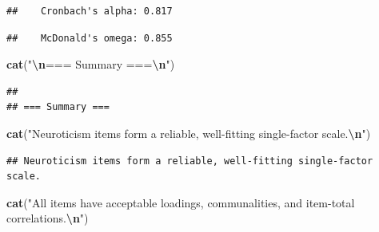 \documentclass[
]{article}
\newenvironment{Shaded}{\begin{snugshade}}{\end{snugshade}}
\newcommand{\AttributeTok}[1]{\textcolor[rgb]{0.13,0.29,0.53}{#1}}
\newcommand{\ConstantTok}[1]{\textcolor[rgb]{0.56,0.35,0.01}{#1}}
\newcommand{\DecValTok}[1]{\textcolor[rgb]{0.00,0.00,0.81}{#1}}
\newcommand{\FunctionTok}[1]{\textcolor[rgb]{0.13,0.29,0.53}{\textbf{#1}}}
\newcommand{\NormalTok}[1]{#1}
\newcommand{\SpecialCharTok}[1]{\textcolor[rgb]{0.81,0.36,0.00}{\textbf{#1}}}
\newcommand{\StringTok}[1]{\textcolor[rgb]{0.31,0.60,0.02}{#1}}
\begin{document}
\begin{verbatim}
##    Cronbach's alpha: 0.817
\end{verbatim}

\begin{Shaded}
\end{Shaded}

\begin{verbatim}
##    McDonald's omega: 0.855
\end{verbatim}

\begin{Shaded}
\begin{Highlighting}[]
\FunctionTok{cat}\NormalTok{(}\StringTok{"}\SpecialCharTok{\textbackslash{}n}\StringTok{=== Summary ===}\SpecialCharTok{\textbackslash{}n}\StringTok{"}\NormalTok{)}
\end{Highlighting}
\end{Shaded}

\begin{verbatim}
## 
## === Summary ===
\end{verbatim}

\begin{Shaded}
\begin{Highlighting}[]
\FunctionTok{cat}\NormalTok{(}\StringTok{"Neuroticism items form a reliable, well{-}fitting single{-}factor scale.}\SpecialCharTok{\textbackslash{}n}\StringTok{"}\NormalTok{)}
\end{Highlighting}
\end{Shaded}

\begin{verbatim}
## Neuroticism items form a reliable, well-fitting single-factor scale.
\end{verbatim}

\begin{Shaded}
\begin{Highlighting}[]
\FunctionTok{cat}\NormalTok{(}\StringTok{"All items have acceptable loadings, communalities, and item{-}total correlations.}\SpecialCharTok{\textbackslash{}n}\StringTok{"}\NormalTok{)}
\end{Highlighting}
\end{Shaded}
\end{document}
